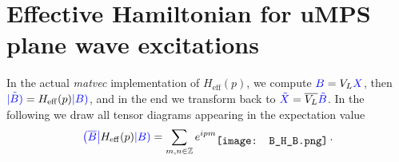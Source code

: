\section*{Effective Hamiltonian for uMPS plane wave excitations}
In the actual \textit{matvec} implementation of $H_{\mathrm{eff}}(p)$, we compute $\textcolor{blue}{B} = V_L \textcolor{blue}{X}$, then $\textcolor{blue}{\Tilde{\left| B \right)}} = H_{\mathrm{eff}}(p) \textcolor{blue}{\left| B \right)}$, and in the end we transform back to $\textcolor{blue}{\Tilde{X}} = \overline{V_L} \textcolor{blue}{\Tilde{B}}$. In the following we draw all tensor diagrams appearing in the expectation value
\begin{equation*}
	\textcolor{blue}{\tbra{\overline{B}}} H_{\mathrm{eff}}(p) \textcolor{blue}{\tket{B}} = \sum_{m, n \in \mathbb{Z}} e^{ipm} \raisebox{-0.5\height}{\texttt{[image: B\_H\_B.png]}} \hspace{0.2em} .
\end{equation*}

